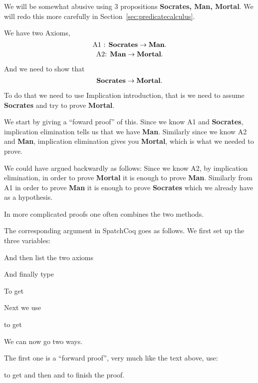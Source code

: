 \begin{itemize}
We will be somewhat abusive using 3 propositions {\bf Socrates, Man, Mortal}. We will redo this more carefully in Section~\ref{sec:predicatecalculus}.

We have two Axioms, 
$$\mbox{A1 :  \bf Socrates} \rightarrow \mbox{\bf Man}.$$
$$\mbox{A2: \bf  Man} \rightarrow \mbox{\bf Mortal}.$$

And we need to show that $$\mbox{\bf Socrates} \rightarrow \mbox{\bf Mortal}.$$



To do that we need to use Implication introduction, that is we need to assume {\bf Socrates} and try to prove {\bf Mortal}. 

 We start by giving a ``foward proof'' of this. Since we know  A1 and {\bf Socrates}, implication elimination tells us that we have {\bf Man}. Similarly since we know A2 and {\bf Man}, implication elimination gives you {\bf Mortal}, which is what we needed to prove.

We could have argued backwardly as follows: Since we know A2, by implication elimination, in order to prove {\bf Mortal} it is enough to prove {\bf Man}. Similarly from A1 in order to prove {\bf Man} it is enough to prove {\bf Socrates} which we already have as a hypothesis.

In more complicated proofs one often combines the two methods.



The corresponding argument in SpatchCoq goes as follows. We first set up the three variables:


And then list the two axioms


And finally type

To get

Next we use

to get


We can now go two ways. 

The first one is a ``forward proof'', very much like the text above, use:

to get
and then 
and 
to finish the proof.


\end{itemize}
